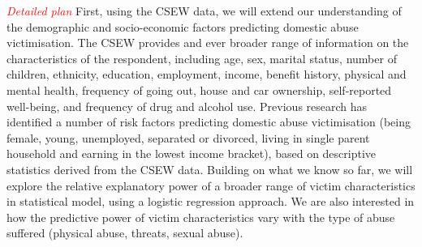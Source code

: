 \documentclass[11pt, a4paper]{article}
\begin{document}
%
%

\textcolor{red}{\textit{Detailed plan}} First, using the CSEW data, we will extend our understanding of the demographic and socio-economic factors predicting domestic abuse victimisation. The CSEW provides and ever broader range of information on the characteristics of the respondent, including age, sex, marital status, number of children, ethnicity, education, employment, income, benefit history, physical and mental health, frequency of going out, house and car ownership, self-reported well-being, and frequency of drug and alcohol use. Previous research has identified a number of risk factors predicting domestic abuse victimisation (being female, young, unemployed, separated or divorced, living in single parent household and earning in the lowest income bracket), based on descriptive statistics derived from the CSEW data. Building on what we know so far, we will explore the relative explanatory power of a broader range of victim characteristics in statistical model, using a logistic regression approach. We are also interested in how the predictive power of victim characteristics vary with the type of abuse suffered (physical abuse, threats, sexual abuse).
\end{document}
